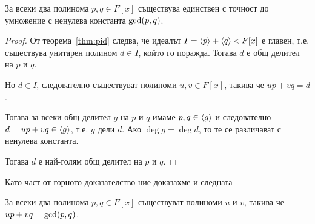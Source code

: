 \documentclass[numbers=endperiod, DIV=15, bibliography=totocnumbered]{scrartcl}
\begin{document}
\begin{theorem}
  За всеки два полинома $p, q \in F[x]$ съществува единствен с точност до умножение с ненулева константа $\operatorname{gcd}(p, q)$.
\end{theorem}
\begin{proof}
  От теорема~\ref{thm:pid} следва, че идеалът $I = \left\langle p \right\rangle + \left\langle q \right\rangle \lhd F[x]$ е главен, т.е. съществува унитарен полином $d \in I$, който го поражда.
  Тогава $d$ е общ делител на $p$ и $q$.

  Но $d \in I$, следователно съществуват полиноми $u, v \in F[x]$, такива че $u p + v q = d$.

  Тогава за всеки общ делител $g$ на $p$ и $q$ имаме $p, q \in \left\langle g \right\rangle$ и следователно $d = u p + v q \in \left\langle g \right\rangle$, т.е. $g$ дели $d$. Ако $\deg g = \deg d$, то те се различават с ненулева константа.

  Тогава $d$ е най-голям общ делител на $p$ и $q$.
\end{proof}

Като част от горното доказателство ние доказахме и следната
\begin{theorem}
  За всеки два полинома $p, q \in F[x]$ съществуват полиноми $u$ и $v$, такива че $u p + v q = \operatorname{gcd}(p, q)$.
\end{theorem}
\end{document}
